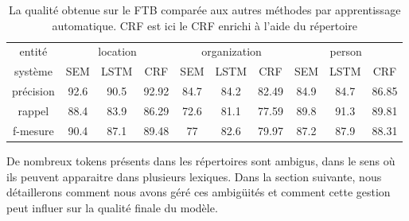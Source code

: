 \documentclass[12pt,a4paper,times,twoside,openright]{report}
\begin{document}
\begin{table}[ht!]
\centering
\small
\begin{tabular}{|c|ccc|ccc|ccc|}
\hline
entité                  & \multicolumn{3}{c|}{location} & \multicolumn{3}{c|}{organization} & \multicolumn{3}{c|}{person} \\
système                 & SEM  & LSTM & CRF             & SEM  & LSTM & CRF                 & SEM  & LSTM & CRF \\
\hline
précision               & 92.6 & 90.5 & 92.92           & 84.7 & 84.2 & 82.49               & 84.9 & 84.7 & 86.85 \\
rappel                  & 88.4 & 83.9 & 86.29           & 72.6 & 81.1 & 77.59               & 89.8 & 91.3 & 89.81 \\
f-mesure                & 90.4 & 87.1 & 89.48           & 77   & 82.6 & 79.97               & 87.2 & 87.9 & 88.31 \\
\hline
\end{tabular}
\caption{La qualité obtenue sur le FTB comparée aux autres méthodes par apprentissage automatique. CRF est ici le CRF enrichi à l'aide du répertoire}
\label{tab:ftb6-directory-vs-NN}
\end{table}

De nombreux tokens présents dans les répertoires sont ambigus, dans le sens où ils peuvent apparaitre dans plusieurs lexiques. Dans la section suivante, nous détaillerons comment nous avons géré ces ambigüités et comment cette gestion peut influer sur la qualité finale du modèle.
\end{document}

